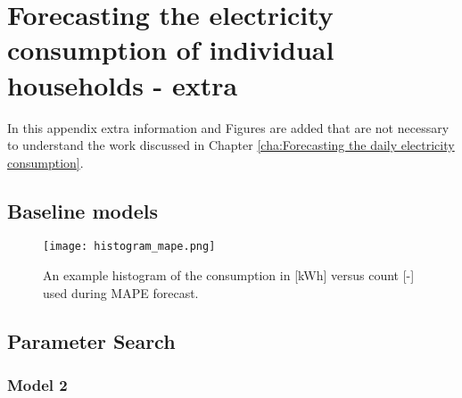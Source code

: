 \chapter{Forecasting the electricity consumption of individual households - extra}
\label{app:B}

In this appendix extra information and Figures are added that are not necessary to understand the work discussed in Chapter \ref{cha:Forecasting the daily electricity consumption}.

\section{Baseline models}

 \begin{figure}[h]
	\centering
	\texttt{[image: histogram\_mape.png]}
	\caption{An example histogram of the consumption in [kWh] versus count [-] used during MAPE forecast.}
	\label{fig:histogram_mape}
\end{figure}

\section{Parameter Search}

\subsection{Model 2}

